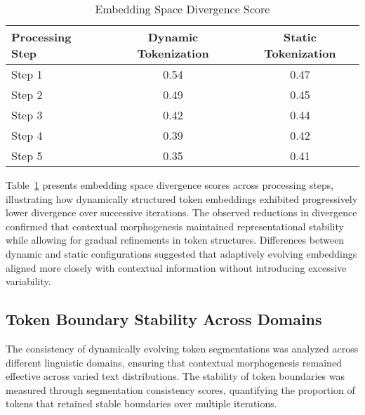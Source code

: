 \documentclass{article}
\begin{document}
\begin{table}[t]
	\centering
	\caption{Embedding Space Divergence Score}
	\label{tab:embedding_divergence}
	\renewcommand{\arraystretch}{1.3}
	\setlength{\arrayrulewidth}{0.5mm}
	\setlength{\tabcolsep}{8pt}
		\begin{tabular}{|l|c|c|}
			\hline
			\textbf{Processing Step} & \textbf{Dynamic Tokenization} & \textbf{Static Tokenization} \\
			\hline\hline
			Step 1 & 0.54 & 0.47 \\
			\hline
			Step 2 & 0.49 & 0.45 \\
			\hline
			Step 3 & 0.42 & 0.44 \\
			\hline
			Step 4 & 0.39 & 0.42 \\
			\hline
			Step 5 & 0.35 & 0.41 \\
			\hline
		\end{tabular}
\end{table}

Table~\ref{tab:embedding_divergence} presents embedding space divergence scores across processing steps, illustrating how dynamically structured token embeddings exhibited progressively lower divergence over successive iterations. The observed reductions in divergence confirmed that contextual morphogenesis maintained representational stability while allowing for gradual refinements in token structures. Differences between dynamic and static configurations suggested that adaptively evolving embeddings aligned more closely with contextual information without introducing excessive variability.

\subsection{Token Boundary Stability Across Domains}

The consistency of dynamically evolving token segmentations was analyzed across different linguistic domains, ensuring that contextual morphogenesis remained effective across varied text distributions. The stability of token boundaries was measured through segmentation consistency scores, quantifying the proportion of tokens that retained stable boundaries over multiple iterations.
\end{document}
